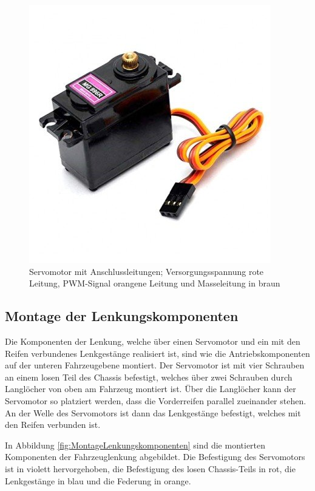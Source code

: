 \begin{figure}[H] %
\includegraphics[width=.50\textwidth]{sec5/images/Servo.jpg} 
\centering
\captionsetup{width=.95\textwidth}
\caption[Servomotor mit Anschlussleitungen~\cite{DIYE}]{Servomotor mit Anschlussleitungen; Versorgungsspannung rote Leitung, \ac{PWM}-Signal orangene Leitung und Masseleitung in braun~\cite{DIYE}}\centering
\label{fig:ServoMotor}
\end{figure}

\newpage
\subsection{Montage der Lenkungskomponenten}\label{Sec5Sub2}

Die Komponenten der Lenkung, welche über einen Servomotor und ein mit den Reifen verbundenes Lenkgestänge realisiert ist, sind wie die Antriebskomponenten auf der unteren Fahrzeugebene montiert. Der Servomotor ist mit vier Schrauben an einem losen Teil des Chassis befestigt, welches über zwei Schrauben durch Langlöcher von oben am Fahrzeug montiert ist. Über die Langlöcher kann der Servomotor so platziert werden, dass die Vorderreifen parallel zueinander stehen. An der Welle des Servomotors ist dann das Lenkgestänge befestigt, welches mit den Reifen verbunden ist.\vspace{11pt}

In Abbildung \ref{fig:MontageLenkungskomponenten} sind die montierten Komponenten der Fahrzeuglenkung abgebildet. Die Befestigung des Servomotors ist in violett hervorgehoben, die Befestigung des losen Chassis-Teils in rot, die Lenkgestänge in blau und die Federung in orange.

